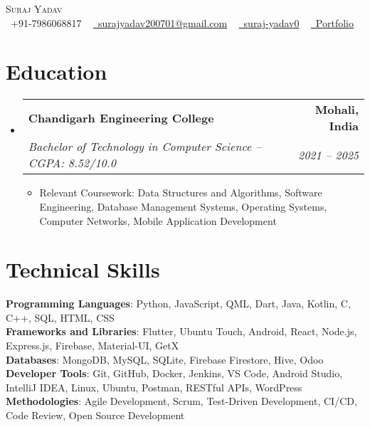 \documentclass[a4paper,11pt]{article}
\makeatletter
\newcommand{\resumeItem}[1]{
  \item\small{
    {#1 \vspace{-2pt}}
  }
}
\newcommand{\resumeSubheading}[4]{
  \vspace{-2pt}\item
    \begin{tabular*}{1.0\textwidth}[t]{l@{\extracolsep{\fill}}r}
      \textbf{#1} & \textbf{\small #2} \\
      \textit{\small#3} & \textit{\small #4} \\
    \end{tabular*}\vspace{-7pt}
}
\newcommand{\resumeSubHeadingListStart}{\begin{itemize}[leftmargin=0.0in, label={}]}
\newcommand{\resumeSubHeadingListEnd}{\end{itemize}}
\newcommand{\resumeItemListStart}{\begin{itemize}}
\newcommand{\resumeItemListEnd}{\end{itemize}\vspace{-5pt}}
\makeatother
\begin{document}
\begin{center}
    {\Huge \scshape Suraj Yadav} \\ \vspace{1pt}
    \small \raisebox{-0.1\height}\faMobile\ +91-7986068817 ~ 
    \href{mailto:surajyadav200701@gmail.com}{\raisebox{-0.2\height}\faEnvelope\  surajyadav200701@gmail.com} ~ 
    \href{https://github.com/suraj-yadav0}{\raisebox{-0.2\height}\faGithub\ suraj-yadav0} ~
    \href{https://suraj-yadav0.github.io/portfolio-v3/}{\raisebox{-0.2\height}\faGlobe\ Portfolio}
    \vspace{-8pt}
\end{center}

\section{Education}
  \resumeSubHeadingListStart
    \resumeSubheading
      {Chandigarh Engineering College}{Mohali, India}
      {Bachelor of Technology in Computer Science -- CGPA: 8.52/10.0}{2021 -- 2025}
      \resumeItemListStart
        \resumeItem{Relevant Coursework: Data Structures and Algorithms, Software Engineering, Database Management Systems, Operating Systems, Computer Networks, Mobile Application Development}
      \resumeItemListEnd
  \resumeSubHeadingListEnd

\section{Technical Skills}
\begin{itemize}[leftmargin=0.15in, label={}]
    \small{\item{
     \textbf{Programming Languages}{: Python, JavaScript, QML, Dart, Java, Kotlin, C, C++, SQL, HTML, CSS} \\
     \textbf{Frameworks and Libraries}{: Flutter, Ubuntu Touch, Android, React, Node.js, Express.js, Firebase, Material-UI, GetX} \\
     \textbf{Databases}{: MongoDB, MySQL, SQLite, Firebase Firestore, Hive, Odoo} \\
     \textbf{Developer Tools}{: Git, GitHub, Docker, Jenkins, VS Code, Android Studio, IntelliJ IDEA, Linux, Ubuntu, Postman, RESTful APIs, WordPress} \\
     \textbf{Methodologies}{: Agile Development, Scrum, Test-Driven Development, CI/CD, Code Review, Open Source Development}
    }}
\end{itemize}
\vspace{-16pt}
\end{document}
